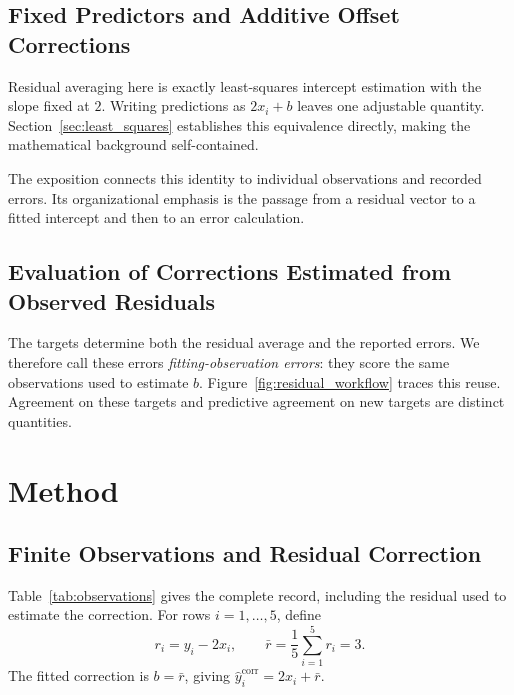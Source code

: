 \documentclass[11pt]{article}
\begin{document}
\subsection{Fixed Predictors and Additive Offset Corrections}

Residual averaging here is exactly least-squares intercept estimation with the slope fixed at $2$. Writing predictions as $2x_i+b$ leaves one adjustable quantity. Section~\ref{sec:least_squares} establishes this equivalence directly, making the mathematical background self-contained.

The exposition connects this identity to individual observations and recorded errors. Its organizational emphasis is the passage from a residual vector to a fitted intercept and then to an error calculation.

\subsection{Evaluation of Corrections Estimated from Observed Residuals}

The targets determine both the residual average and the reported errors. We therefore call these errors \emph{fitting-observation errors}: they score the same observations used to estimate $b$. Figure~\ref{fig:residual_workflow} traces this reuse. Agreement on these targets and predictive agreement on new targets are distinct quantities.

\section{Method}

\subsection{Finite Observations and Residual Correction}

Table~\ref{tab:observations} gives the complete record, including the residual used to estimate the correction. For rows $i=1,\ldots,5$, define
\[
r_i=y_i-2x_i,
\qquad
\bar r=\frac{1}{5}\sum_{i=1}^{5}r_i=3.
\]
The fitted correction is $b=\bar r$, giving
$\hat y_i^{\mathrm{corr}}=2x_i+\bar r$.
\end{document}
